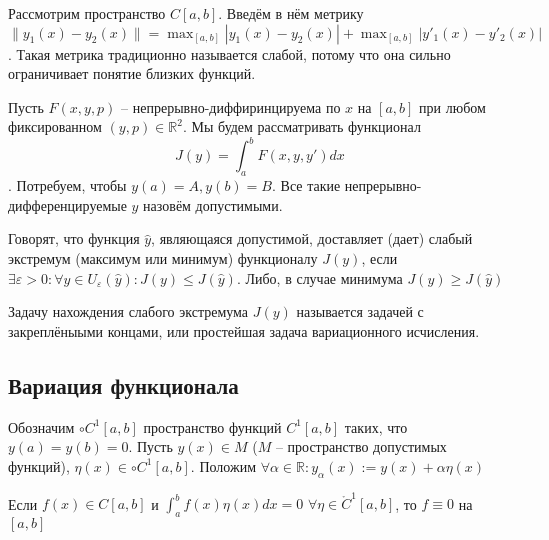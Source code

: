 \documentclass[document.tex]{subfiles}
\begin{document}
\begin{remark}
    Рассмотрим пространство $C[a, b]$. Введём в нём метрику $\|y_1(x) - y_2(x)\| = \max_{[a, b]}|y_1(x) - y_2(x)| +
    \max_{[a, b]} |y'_1(x) - y'_2(x)|$. Такая метрика традиционно называется слабой, потому что она сильно ограничивает
    понятие близких функций.

    Пусть $F(x, y, p)$ -- непрерывно-диффиринцируема по $x$ на $[a, b]$ при любом фиксированном $(y, p) \in
    \mathbb{R}^2$. Мы будем рассматривать функционал
    \[
        J(y) = \int_{a}^{b}F(x, y, y')dx
    \]. Потребуем, чтобы $y(a) = A, y(b) = B$. Все такие непрерывно-дифференцируемые $y$ назовём допустимыми.
\end{remark}

\begin{definition}
    Говорят, что функция $\hat y$, являющаяся допустимой, доставляет (дает) слабый экстремум (максимум или минимум)
    функционалу $J(y)$, если $\exists \varepsilon > 0: \forall y \in U_{\varepsilon}(\hat y): J(y) \leq J(\hat y)$.
    Либо, в случае минимума $J(y) \geq J(\hat y)$
\end{definition}

\begin{definition}
    Задачу нахождения слабого экстремума $J(y)$ называется задачей с закреплёныыми концами, или простейшая задача
    вариационного исчисления.
\end{definition}

\subsection{Вариация функционала}

\begin{definition}
    Обозначим $\circ C^{1}[a, b]$ пространство функций $C^{1}[a, b]$ таких, что $y(a) = y(b) = 0$. Пусть $y(x) \in M$
    ($M$ -- пространство допустимых функций), $\eta(x) \in \circ C^1[a, b]$. Положим $\forall \alpha \in
    \mathbb{R}: y_{\alpha}(x) := y(x) + \alpha \eta(x)$
\end{definition}

\begin{lemma}
    Если $f(x) \in C[a, b]$ и $\int_{a}^{b}f(x)\eta(x)dx = 0$ $\forall \eta \in \mathring{C}^1[a, b]$, то $f \equiv 0$
    на $[a, b]$ 
\end{lemma}
\end{document}
